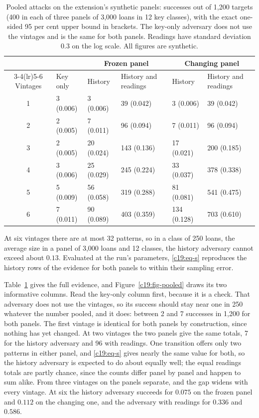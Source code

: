 \begin{table}[ht]
\centering\small
\caption{Pooled attacks on the extension's synthetic panels: successes out of 1,200 targets (400
in each of three panels of 3,000 loans in 12 key classes), with the exact one-sided 95 per cent upper
bound in brackets. The key-only adversary does not use the vintages and is the same for both panels.
Readings have standard deviation $0.3$ on the log scale. All figures are synthetic.}
\label{c19:tab-pooled}
\begin{tabular}{c l ll ll}
\toprule
 & & \multicolumn{2}{c}{Frozen panel} & \multicolumn{2}{c}{Changing panel}\\
\cmidrule(lr){3-4}\cmidrule(lr){5-6}
Vintages & Key only & History & History and readings & History & History and readings\\
\midrule
1 & 3 (0.006) & 3 (0.006) & 39 (0.042) & 3 (0.006) & 39 (0.042)\\
2 & 2 (0.005) & 7 (0.011) & 96 (0.094) & 7 (0.011) & 96 (0.094)\\
3 & 2 (0.005) & 20 (0.024) & 143 (0.136) & 17 (0.021) & 200 (0.185)\\
4 & 3 (0.006) & 25 (0.029) & 245 (0.224) & 33 (0.037) & 378 (0.338)\\
5 & 5 (0.009) & 56 (0.058) & 319 (0.288) & 81 (0.081) & 541 (0.475)\\
6 & 7 (0.011) & 90 (0.089) & 403 (0.359) & 134 (0.128) & 703 (0.610)\\
\bottomrule
\end{tabular}
\end{table}

At six vintages there are at most 32 patterns, so in a class of 250 loans, the average size
in a panel of 3,000 loans and 12 classes, the history adversary cannot exceed about $0.13$.
Evaluated at the run's parameters, \eqref{c19:eq-s} reproduces the history rows of the evidence for
both panels to within their sampling error.

Table~\ref{c19:tab-pooled} gives the full evidence, and Figure~\ref{c19:fig-pooled} draws its two informative columns.
Read the key-only column first, because it is a check. That adversary does not use the vintages, so its success should stay near one in 250 whatever the number pooled, and it does:
between 2 and 7 successes in 1,200 for both panels. The first vintage is identical for both
panels by construction, since nothing has yet changed. At two vintages the two panels give
the same totals, 7 for the history adversary and 96 with readings. One transition offers only
two patterns in either panel, and \eqref{c19:eq-s} gives nearly the same value for both, so the history
adversary is expected to do about equally well; the equal readings totals are partly chance,
since the counts differ panel by panel and happen to sum alike. From three vintages on the
panels separate, and the gap widens with every vintage. At six the history adversary succeeds for $0.075$ on the frozen panel and $0.112$ on the changing one, and the adversary with
readings for $0.336$ and $0.586$.

